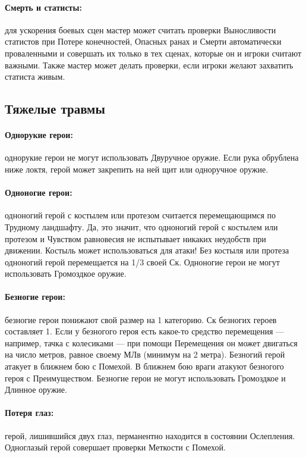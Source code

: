 \paragraph{Смерть и статисты:} для ускорения боевых сцен мастер может считать проверки Выносливости статистов при Потере конечностей, Опасных ранах и Смерти автоматически проваленными и совершать их только в тех сценах, которые он и игроки считают важными. Также мастер может делать проверки, если игроки желают захватить статиста живым.
\subsection{Тяжелые травмы}
\paragraph{Однорукие герои:} однорукие герои не могут использовать Двуручное оружие. Если рука обрублена ниже локтя, герой может закрепить на ней щит или одноручное оружие.
\paragraph{Одноногие герои:} одноногий герой с костылем или протезом считается перемещающимся по Трудному ландшафту. Да, это значит, что одноногий герой с костылем или протезом и Чувством равновесия не испытывает никаких неудобств при движении. Костыль может использоваться для атаки! Без костыля или протеза одноногий герой перемещается на 1/3 своей Ск. Одноногие герои не могут использовать Громоздкое оружие.
\paragraph{Безногие герои:} безногие герои понижают свой размер на 1 категорию. Ск безногих героев составляет 1. Если у безногого героя есть какое-то средство перемещения — например, тачка с колесиками — при помощи Перемещения он может двигаться на число метров, равное своему МЛв (минимум на 2 метра). Безногий герой атакует в ближнем бою с Помехой. В ближнем бою враги атакуют безногого героя с Преимуществом. Безногие герои не могут использовать Громоздкое и Длинное оружие.
\paragraph{Потеря глаз:} герой, лишившийся двух глаз, перманентно находится в состоянии Ослепления. Одноглазый герой совершает проверки Меткости с Помехой.